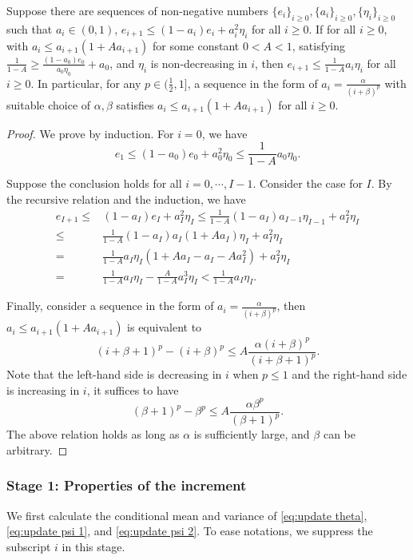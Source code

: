 \begin{lemma}
\label{lemma:recursive mse}
Suppose there are sequences of non-negative numbers $\{e_i\}_{i\geq 0}, \{ a_i \}_{i\geq 0},\{\eta_i\}_{i\geq 0}$ such that $a_i \in (0,1)$, $e_{i+1} \leq (1 -  a_i) e_i + a_i^2 \eta_i$ for all $i\geq 0$. If for all $i\geq 0$, with $a_i \leq a_{i+1}(1 + A a_{i+1})$ for some constant $0 < A < 1$, satisfying $\frac{1}{1-A} \geq \frac{(1-a_0)e_0}{a_0\eta_0} + a_0$, and $\eta_i$ is non-decreasing in $i$, then $e_{i+1} \leq \frac{1}{1-A} a_i \eta_i$ for all $i\geq 0$. In particular, for any $p\in(\frac{1}{2}, 1]$, a sequence in the form of $a_i = \frac{\alpha}{(i + \beta)^p}$ with suitable choice of $\alpha,\beta$ satisfies $a_i \leq a_{i+1}(1 + A a_{i+1})$ for all $i\geq 0$.
\end{lemma}
\begin{proof}
We prove by induction. For $i=0$, we have 
\[ e_1 \leq (1-a_0)e_0 + a_0^2\eta_0 \leq \frac{1}{1-A} a_0 \eta_0 . \]

Suppose the conclusion holds for all $i=0,\cdots,I-1$. Consider the case for $I$. By the recursive relation and the induction, we have
\[\begin{aligned}
e_{I+1} \leq & (1 -  a_I) e_I + a_I^2 \eta_I \leq \frac{1}{1-A} (1 -  a_I) a_{I-1} \eta_{I-1} + a_I^2 \eta_I \\
\leq & \frac{1}{1-A} (1 -  a_I) a_{I}(1 + A a_{I}) \eta_I + a_I^2 \eta_I \\
= &  \frac{1}{1-A}a_I\eta_I(1 + Aa_I - a_I - Aa_I^2) + a_I^2\eta_I \\
= & \frac{1}{1-A}a_I\eta_I - \frac{A}{1-A} a_I^3\eta_I < \frac{1}{1-A}a_I\eta_I .
\end{aligned}  \]

Finally, consider a sequence in the form of $a_i = \frac{\alpha}{(i + \beta)^p}$, then $a_i \leq a_{i+1}(1 + A a_{i+1})$ is equivalent to 
\[ (i+\beta+1)^p - (i + \beta)^p \leq A \frac{\alpha (i+\beta)^p}{(i+\beta+1)^p} .\]
Note that the left-hand side is decreasing in $i$ when $p\leq 1$ and the right-hand side is increasing in $i$, it suffices to have 
\[ (\beta+1)^p - \beta^p \leq A \frac{\alpha \beta^p}{(\beta+1)^p} . \]
The above relation holds as long as $\alpha$ is sufficiently large, and $\beta$ can be arbitrary.
\end{proof}
\subsubsection{Stage 1: Properties of the increment}
We first calculate the conditional mean and variance of \eqref{eq:update theta}, \eqref{eq:update psi 1}, and \eqref{eq:update psi 2}. To ease notations, we suppress the subscript $i$ in this stage.  

